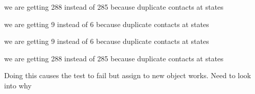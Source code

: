 \begin{DoxyRefList}
\label{todo__todo000012}%
%
we are getting 288 instead of 285 because duplicate contacts at states 

\label{todo__todo000013}%
%
we are getting 9 instead of 6 because duplicate contacts at states 

\label{todo__todo000014}%
%
we are getting 9 instead of 6 because duplicate contacts at states 

\label{todo__todo000015}%
%
we are getting 288 instead of 285 because duplicate contacts at states  
\item[Member \mbox{\hyperlink{tesseract__scene__graph__unit_8cpp_a07e5d7fb0413d0780df4b637bcd35845}{TEST}} (Tesseract\+Scene\+Graph\+Unit, Tesseract\+Scene\+Graph\+Remove\+Link\+Unit)]\label{todo__todo000017}%
%
Doing this causes the test to fail but assign to new object works. Need to look into why 
\end{DoxyRefList}